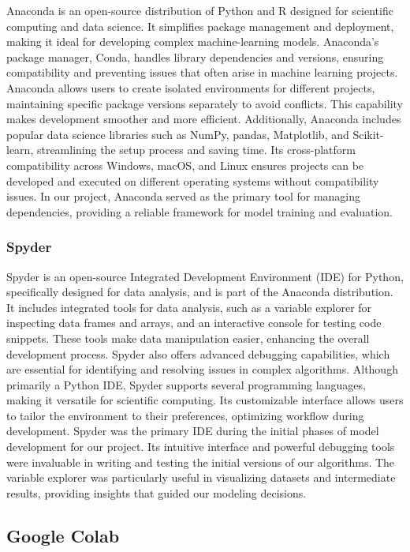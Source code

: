 Anaconda is an open-source distribution of Python and R designed for scientific computing and data science. It simplifies package management and deployment, making it ideal for developing complex machine-learning models. Anaconda's package manager, Conda, handles library dependencies and versions, ensuring compatibility and preventing issues that often arise in machine learning projects. Anaconda allows users to create isolated environments for different projects, maintaining specific package versions separately to avoid conflicts. This capability makes development smoother and more efficient. Additionally, Anaconda includes popular data science libraries such as NumPy, pandas, Matplotlib, and Scikit-learn, streamlining the setup process and saving time. Its cross-platform compatibility across Windows, macOS, and Linux ensures projects can be developed and executed on different operating systems without compatibility issues. In our project, Anaconda served as the primary tool for managing dependencies, providing a reliable framework for model training and evaluation.

\subsubsection{Spyder}

Spyder is an open-source Integrated Development Environment (IDE) for Python, specifically designed for data analysis, and is part of the Anaconda distribution. It includes integrated tools for data analysis, such as a variable explorer for inspecting data frames and arrays, and an interactive console for testing code snippets. These tools make data manipulation easier, enhancing the overall development process. Spyder also offers advanced debugging capabilities, which are essential for identifying and resolving issues in complex algorithms. Although primarily a Python IDE, Spyder supports several programming languages, making it versatile for scientific computing. Its customizable interface allows users to tailor the environment to their preferences, optimizing workflow during development. Spyder was the primary IDE during the initial phases of model development for our project. Its intuitive interface and powerful debugging tools were invaluable in writing and testing the initial versions of our algorithms. The variable explorer was particularly useful in visualizing datasets and intermediate results, providing insights that guided our modeling decisions.


\subsection{Google Colab}

